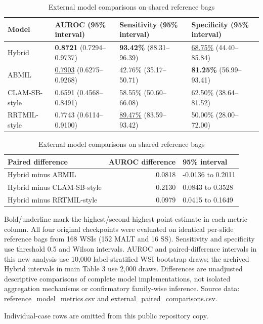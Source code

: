 \begin{table}[H]\centering
\caption{External model comparisons on shared reference bags}\label{tab:S11}
\small
\begin{tabular}{p{}p{}p{}p{}}
\toprule
Model & AUROC (95\% interval) & Sensitivity (95\% interval) & Specificity (95\% interval) \\
\midrule
Hybrid & \textbf{0.8721} (0.7294--0.9737) & \textbf{93.42\%} (88.31--96.39) & \underline{68.75\%} (44.40--85.84) \\
ABMIL & \underline{0.7903} (0.6275--0.9268) & 42.76\% (35.17--50.71) & \textbf{81.25\%} (56.99--93.41) \\
CLAM-SB-style & 0.6591 (0.4568--0.8491) & 58.55\% (50.60--66.08) & 62.50\% (38.64--81.52) \\
RRTMIL-style & 0.7743 (0.6114--0.9100) & \underline{89.47\%} (83.59--93.42) & 50.00\% (28.00--72.00) \\
\bottomrule
\end{tabular}
\medskip
\begin{tabular}{p{}rp{}}
\toprule
Paired difference & AUROC difference & 95\% interval \\
\midrule
Hybrid minus ABMIL & 0.0818 & -0.0136 to 0.2011 \\
Hybrid minus CLAM-SB-style & 0.2130 & 0.0843 to 0.3528 \\
Hybrid minus RRTMIL-style & 0.0979 & 0.0415 to 0.1649 \\
\bottomrule
\end{tabular}
\par\medskip\raggedright\footnotesize Bold/underline mark the highest/second-highest point estimate in each metric column. All four original checkpoints were evaluated on identical per-slide reference bags from 168 WSIs (152 MALT and 16 SS). Sensitivity and specificity use threshold 0.5 and Wilson intervals. AUROC and paired-difference intervals in this new analysis use 10,000 label-stratified WSI bootstrap draws; the archived Hybrid intervals in main Table 3 use 2,000 draws. Differences are unadjusted descriptive comparisons of complete model implementations, not isolated aggregation mechanisms or confirmatory family-wise inference. Source data: reference\_model\_metrics.csv and external\_paired\_comparisons.csv.
\end{table}
\clearpage
\begin{table}[H]\centering
\caption{Archived segmentation-contour coverage of the eight displayed regions}\label{tab:S12}
\small Individual-case rows are omitted from this public repository copy.
\end{table}
